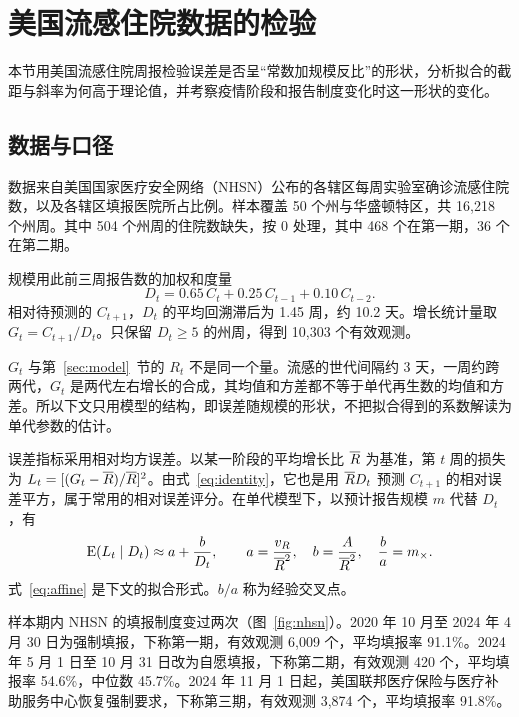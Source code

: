 \section{美国流感住院数据的检验}
\label{sec:empirical}

本节用美国流感住院周报检验误差是否呈“常数加规模反比”的形状，分析拟合的截距与斜率为何高于理论值，并考察疫情阶段和报告制度变化时这一形状的变化。

\subsection{数据与口径}
\label{sec:empirical-data}

数据来自美国国家医疗安全网络（NHSN）公布的各辖区每周实验室确诊流感住院数，以及各辖区填报医院所占比例\citep{cdc2026nhsn}。样本覆盖 50 个州与华盛顿特区，共 16,218 个州周。其中 504 个州周的住院数缺失，按 0 处理，其中 468 个在第一期，36 个在第二期。

规模用此前三周报告数的加权和度量
\begin{equation}
  D_t=0.65\,C_t+0.25\,C_{t-1}+0.10\,C_{t-2}.
  \label{eq:dt}
\end{equation}
相对待预测的 $C_{t+1}$，$D_t$ 的平均回溯滞后为 1.45 周，约 10.2 天。增长统计量取 $G_t=C_{t+1}/D_t$。只保留 $D_t\geq5$ 的州周，得到 10,303 个有效观测。

$G_t$ 与第~\ref{sec:model}~节的 $R_t$ 不是同一个量。流感的世代间隔约 3 天，一周约跨两代，$G_t$ 是两代左右增长的合成，其均值和方差都不等于单代再生数的均值和方差。所以下文只用模型的结构，即误差随规模的形状，不把拟合得到的系数解读为单代参数的估计。

误差指标采用相对均方误差。以某一阶段的平均增长比 $\overline{R}$ 为基准，第 $t$ 周的损失为 $L_t=[(G_t-\overline{R})/\overline{R}]^2$。由式~\eqref{eq:identity}，它也是用 $\overline{R} D_t$ 预测 $C_{t+1}$ 的相对误差平方，属于常用的相对误差评分\citep{bosse2023scoring}。在单代模型下，以预计报告规模 $m$ 代替 $D_t$，有
\begin{equation}
  \operatorname{E}(L_t\mid D_t)\approx a+\frac{b}{D_t},\qquad a=\frac{v_R}{\overline{R}^2},\quad b=\frac{A}{\overline{R}^2},\quad \frac ba=m_{\times}.
  \label{eq:affine}
\end{equation}
式~\eqref{eq:affine} 是下文的拟合形式。$b/a$ 称为经验交叉点。

样本期内 NHSN 的填报制度变过两次（图~\ref{fig:nhsn}）。2020 年 10 月至 2024 年 4 月 30 日为强制填报，下称第一期，有效观测 6,009 个，平均填报率 91.1\%。2024 年 5 月 1 日至 10 月 31 日改为自愿填报，下称第二期，有效观测 420 个，平均填报率 54.6\%，中位数 45.7\%。2024 年 11 月 1 日起，美国联邦医疗保险与医疗补助服务中心恢复强制要求，下称第三期，有效观测 3,874 个，平均填报率 91.8\%。

